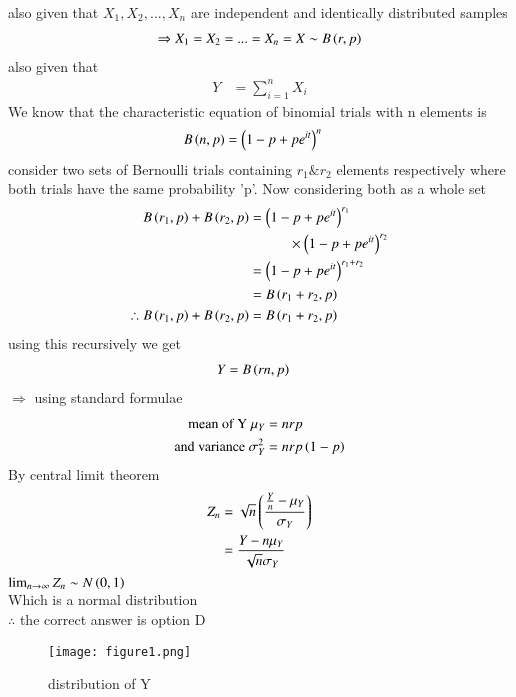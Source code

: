 \documentclass[journal,12pt,twocolumn]{IEEEtran}
\begin{document}
also given that $X_1,X_2,...,X_n$ are independent and identically distributed samples 
\begin{align}
    \Rightarrow X_1=X_2=...=X_n=X \sim B\left(r,p\right)
\end{align}
also given that
\begin{align}
Y&=\displaystyle\sum_{i=1}^n X_i
\end{align}
We know that the characteristic equation of binomial trials with n elements is \begin{align}
    B\left(n,p\right)&={\left(1-p+p e^{it}\right)}^n
\end{align}
consider two sets of Bernoulli trials containing $r_1 \& r_2$ elements respectively where both trials have the same probability 'p'. Now considering both as a whole set
\begin{align}
B\left(r_1,p\right)+B\left(r_2,p\right)&={\left(1-p+p e^{it}\right)}^{r_1}\nonumber\\
&\hspace*{1cm}\times {\ensuremath{\left(1-p+p e^{it}\right)}}^{r_2}\\
&={\left(1-p+p e^{it}\right)}^{r_1+r_2}\\
&=B\left(r_1+r_2,p\right)\nonumber\\
\therefore B\left(r_1,p\right)+B\left(r_2,p\right)&=B\left(r_1+r_2,p\right)
\end{align}
using this recursively we get
\begin{align}
    Y&=B\left(r n,p\right)
\end{align}
$\Rightarrow$ using standard formulae
\begin{align}
\text{mean of Y } \mu_Y&=nrp \nonumber\\
\text{and variance } \sigma^2_Y&=nrp\left(1-p\right)
\end{align}
By central limit theorem
\begin{align}
    Z_n &= \sqrt{n}\left(\frac{\frac{Y}{n} - \mu_Y}{\sigma_Y}\right)\nonumber\\
    &=\frac{Y-n \mu_Y}{\sqrt{n} \sigma_Y}
\end{align}
$\lim_{n \rightarrow \infty} Z_n \sim N\left(0,1\right)$ \\
Which is a normal distribution\\
$\therefore$ the correct answer is option D
\begin{figure}[ht]
    \centering
    \texttt{[image: figure1.png]}
    \caption{distribution of Y}
    \label{fig:my_label}
\end{figure}
\end{document}
